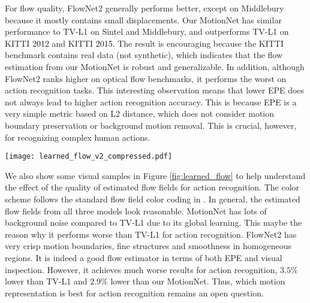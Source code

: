 \documentclass[runningheads]{llncs}
\begin{document}
		{ \color{black} For flow quality, FlowNet2 generally performs better, except on Middlebury because it mostly contains small displacements. Our MotionNet has similar performance to TV-L1 on Sintel and Middlebury, and outperforms TV-L1 on KITTI 2012 and KITTI 2015. The result is encouraging because the KITTI benchmark contains real data (not synthetic), which indicates that the flow estimation from our MotionNet is robust and generalizable. In addition, although FlowNet2 ranks higher on optical flow benchmarks, it performs the worst on action recognition tasks.} This interesting observation means that lower EPE does not always lead to higher action recognition accuracy. This is because EPE is a very simple metric based on L2 distance, which does not consider motion boundary preservation or background motion removal. This is crucial, however, for recognizing complex human actions. 
		
		\begin{figure*}[t]
			\centering
			\texttt{[image: learned\_flow\_v2\_compressed.pdf]}
			\caption{Visual comparisons of estimated flow field from TV-L1, MotionNet and FlowNet2. Left: ApplyEyeMakeup, BabyCrawling, BodyWeightSquats, BoxingPunchingBag and CleanAndJerk. Right: Hammering, PlayingFlute, PommelHorse, WallPushups and YoYo. This figure is best viewed in color.}
			\label{fig:learned_flow}
		\end{figure*}
		
		We also show some visual samples in Figure \ref{fig:learned_flow} to help understand the effect of the quality of estimated flow fields for action recognition. The color scheme follows the standard flow field color coding in \cite{flownet2}. In general, the estimated flow fields from all three models look reasonable. 
		MotionNet has lots of background noise compared to TV-L1 due to its global learning. This maybe the reason why it performs worse than TV-L1 for action recognition. FlowNet2 has very crisp motion boundaries, fine structures and smoothness in homogeneous regions. It is indeed a good flow estimator in terms of both EPE and visual inspection. However, it achieves much worse results for action recognition, $3.5\%$ lower than TV-L1 and $2.9\%$ lower than our MotionNet. Thus, which motion representation is best for action recognition remains an open question. 
		


		
		
\end{document}
